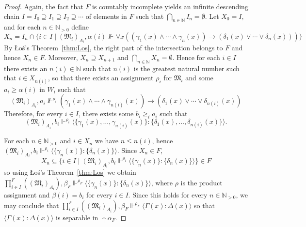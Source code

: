 \documentclass[submission,copyright,creativecommons]{eptcs}
\newcommand{\mo}{\mathfrak}
\newcommand{\consec}[2]{\langle #1:#2 \rangle}
\newcommand{\satisfySym}{\Vdash}
\newcommand{\satisfy}[4]{#1, #2 \satisfySym^{#4} #3}
\newcommand{\notsatisfy}[4]{#1, #2 \not\Vdash^{#4} #3}
\begin{document}
\begin{proof}
  Again, the fact that $F$ is countably incomplete yields an infinite
  descending chain $I = I_0 \supseteq I_1 \supseteq I_2 \supseteq \cdots$
  of elements in $F$ such that $\bigcap_{n \in \mathbb{N}} I_n = \emptyset$.
  Let $X_0 = I$, and for each $n \in \mathbb{N}_{>0}$ define
  \begin{equation*}
    X_n = I_n \cap \{i  \in I \mid \notsatisfy{(\mo{M}_i)_{A_i}}{\alpha(i)}{\forall x( (\gamma_1(x) \wedge \cdots \wedge \gamma_n(x)) \to (\delta_1(x) \vee \cdots \vee \delta_n(x)))}{}\}
  \end{equation*}
  By \L{}o{\'s}'s Theorem~\ref{thm:Los}, the right part of the intersection
  belongs to $F$ and hence $X_n \in F$. Moreover, $X_n \supseteq X_{n+1}$
  and $\bigcap_{n \in\mathbb{N}} X_n = \emptyset$. 
%
  Hence for each $i \in I$ there exists an $n(i) \in \mathbb{N}$ such that $n(i)$
  is the greatest natural number such that $i \in X_{n(i)}$, so that there exists an 
  assignment $\rho_i$ for $\mo{M}_i$ and some $a_i \geq \alpha(i)$ in $W_i$
  such that
  \begin{equation*}
    \notsatisfy{(\mo{M}_i)_{A_i}}{a_i}{(\gamma_1(x) \wedge \cdots \wedge \gamma_{n(i)}(x)) \to (\delta_1(x) \vee \cdots \vee \delta_{n(i)}(x))}{\rho_i}
  \end{equation*}
  Therefore, for every $i \in I$, there exists some $b_i \geq_i a_i$ such that 
  \begin{equation*}
    \satisfy{(\mo{M}_i)_{A_i}}{b_i}{\consec{\{\gamma_1(x),\ldots,\gamma_{n(i)}(x)\}}{\{\delta_1(x),\ldots,\delta_{n(i)}(x)\}}}{\rho_i}.
  \end{equation*}

  For each $n \in \mathbb{N}_{>0}$ and $i \in X_n$ we have $n \leq n(i)$, hence
  $\satisfy{(\mo{M}_i)_{A_i}}{b_i}{\consec{\{\gamma_n(x)\}}{\{\delta_n(x)\}}}{\rho_i}$.
  Since $X_n \in F$, 
  \begin{equation*}
    X_n \subseteq \{ i \in I \mid \satisfy{(\mo{M}_i)_{A_i}}{b_i}{\consec{\{\gamma_n(x)\}}{\{\delta_n(x)\}}}{\rho_i}\} \in F
  \end{equation*}
  so using \L{}o{\'s}'s Theorem~\ref{thm:Los} we obtain
  $\satisfy{\prod_{i \in I}^F((\mo{M}_i)_{A_i})}{\beta_F}{\consec{\{\gamma_n(x)\}}{\{\delta_n(x)\}}}{\rho_F}$, where $\rho$ is the product assignment and $\beta(i)=b_i$ for every $i \in I$.
  Since this holds for every $n \in \mathbb{N}_{>0}$,
  we may conclude that 
  $\satisfy{\prod_{i \in I}^F((\mo{M}_i)_{A_i})}{\beta_F}{\consec{\Gamma(x)}{\Delta(x)}}{\rho_F}$
  so that $\consec{\Gamma(x)}{\Delta(x)}$ is separable in ${\uparrow}\alpha_F$.
\end{proof}
\end{document}
